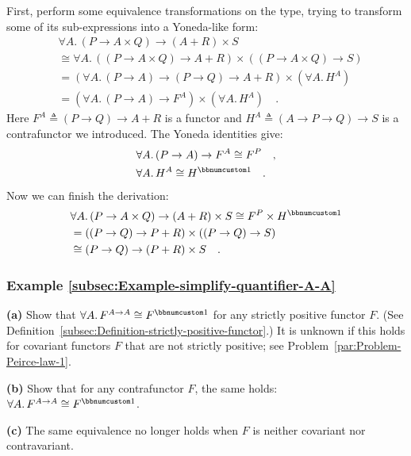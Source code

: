 First, perform some equivalence transformations on the type, trying
to transform some of its sub-expressions into a Yoneda-like form:
\begin{align*}
 & \forall A.\,(P\rightarrow A\times Q)\rightarrow(A+R)\times S\\
 & \cong\forall A.\,((P\rightarrow A\times Q)\rightarrow A+R)\times((P\rightarrow A\times Q)\rightarrow S)\\
 & =(\forall A.\,(P\rightarrow A)\rightarrow(P\rightarrow Q)\rightarrow A+R)\times(\forall A.\,H^{A})\\
 & =(\forall A.\,(P\rightarrow A)\rightarrow F^{A})\times(\forall A.\,H^{A})\quad.
\end{align*}
Here $F^{A}\triangleq(P\rightarrow Q)\rightarrow A+R$ is a functor
and $H^{A}\triangleq(A\rightarrow P\rightarrow Q)\rightarrow S$ is
a contrafunctor we introduced. The Yoneda identities give:
\begin{align*}
 & \forall A.\,(P\rightarrow A)\rightarrow F^{A}\cong F^{P}\quad,\\
 & \forall A.\,H^{A}\cong H^{\bbnum 1}\quad.
\end{align*}
Now we can finish the derivation:
\begin{align*}
 & \forall A.\,(P\rightarrow A\times Q)\rightarrow(A+R)\times S\cong F^{P}\times H^{\bbnum 1}\\
 & =((P\rightarrow Q)\rightarrow P+R)\times((P\rightarrow Q)\rightarrow S)\\
 & \cong(P\rightarrow Q)\rightarrow(P+R)\times S\quad.
\end{align*}


\subsubsection{Example \label{subsec:Example-simplify-quantifier-A-A}\ref{subsec:Example-simplify-quantifier-A-A}}

\textbf{(a)} Show that $\forall A.\,F^{A\rightarrow A}\cong F^{\bbnum 1}$
for any strictly positive functor $F$. (See Definition~\ref{subsec:Definition-strictly-positive-functor}.)
It is unknown if this holds for covariant functors $F$ that are not
strictly positive; see Problem~\ref{par:Problem-Peirce-law-1}.

\textbf{(b)} Show that for any contrafunctor $F$, the same holds:
$\forall A.\,F^{A\rightarrow A}\cong F^{\bbnum 1}$.

\textbf{(c)} The same equivalence no longer holds when $F$ is neither
covariant nor contravariant.

